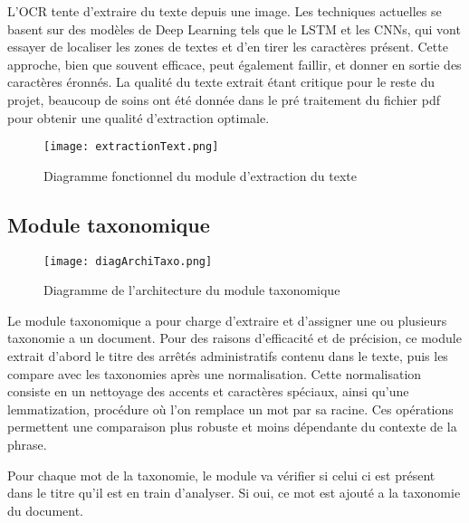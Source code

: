 L'OCR tente d'extraire du texte depuis une image.
Les techniques actuelles se basent sur des modèles de Deep Learning tels que le LSTM et les CNNs, qui vont essayer de localiser les zones de textes et d'en tirer les caractères présent.
Cette approche, bien que souvent efficace, peut également faillir, et donner en sortie des caractères éronnés.
La qualité du texte extrait étant critique pour le reste du projet, beaucoup de soins ont été donnée dans le pré traitement du fichier pdf pour obtenir une qualité d'extraction optimale.

\begin{figure}[h!]
  \centering
	\texttt{[image: extractionText.png]}
	\caption[]{Diagramme fonctionnel du module d'extraction du texte}
  \label{}
\end{figure}


\subsection{Module taxonomique}

\begin{figure}[h!]
  \centering
  \texttt{[image: diagArchiTaxo.png]}
	\caption[]{Diagramme de l'architecture du module taxonomique}
  \label{}
\end{figure}


Le module taxonomique a pour charge d'extraire et d'assigner une ou plusieurs taxonomie a un document.
Pour des raisons d'efficacité et de précision, ce module extrait d'abord le titre des arrêtés administratifs contenu dans le texte, puis les compare avec les taxonomies après une normalisation.
Cette normalisation consiste en un nettoyage des accents et caractères spéciaux, ainsi qu'une lemmatization, procédure où l'on remplace un mot par sa racine.
Ces opérations permettent une comparaison plus robuste et moins dépendante du contexte de la phrase. 

Pour chaque mot de la taxonomie, le module va vérifier si celui ci est présent dans le titre qu'il est en train d'analyser.
Si oui, ce mot est ajouté a la taxonomie du document.

